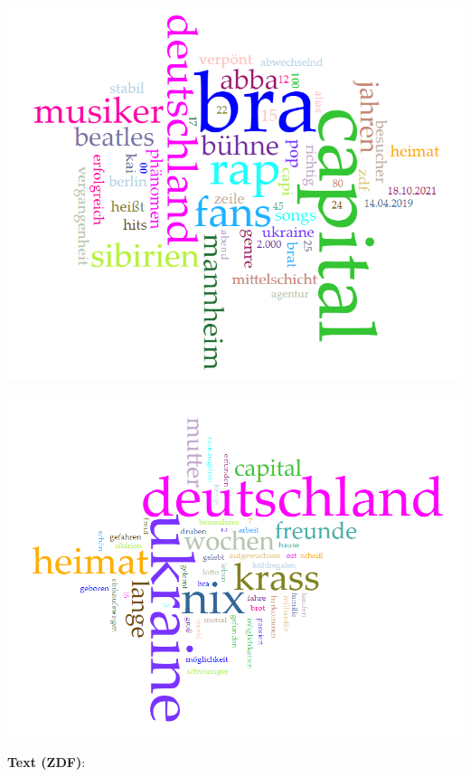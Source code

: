 \documentclass[
  letterpaper,
]{scrbook}
\begin{document}
\includegraphics[width=1\textwidth,height=\textheight]{./pictures/capital_bra_untertitel.png}

\includegraphics[width=1\textwidth,height=\textheight]{./pictures/capital_bra_zdf.png}

\textbf{Text (ZDF)}:
\end{document}
